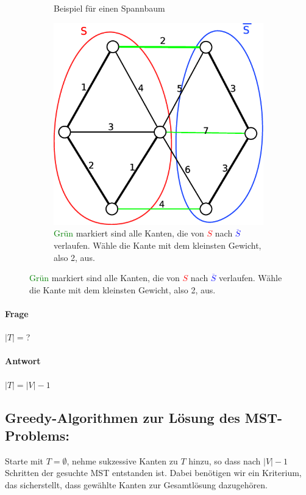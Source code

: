 \begin{figure}
\begin{subfigure}[h]{0.3\textwidth}
	\caption{Beispiel für einen Spannbaum}
	\label{fig:Spannbaum2}
\end{subfigure}
\begin{subfigure}[h]{0.3\textwidth}
	\includegraphics[width=\linewidth]{19/Grafik/Schnittlemma1}
	\caption{\textcolor{green}{Grün} markiert sind alle Kanten, die von \textcolor{red}{$S$} nach \textcolor{blue}{$\overline{S}$} verlaufen. Wähle die Kante mit dem kleinsten Gewicht, also 2, aus.}
	\label{fig:Spannbaum3}
\end{subfigure}
\end{figure}

\paragraph{Frage} $|T|= $?
\paragraph{Antwort} $|T| = |V|-1$
\subsection{Greedy-Algorithmen zur Lösung des MST-Problems:}
Starte mit $T=\emptyset$, nehme sukzessive Kanten zu $T$ hinzu, so dass nach $|V|-1$ Schritten der gesuchte MST entstanden ist. 
Dabei benötigen wir ein Kriterium, das sicherstellt, dass gewählte Kanten zur Gesamtlösung dazugehören.
